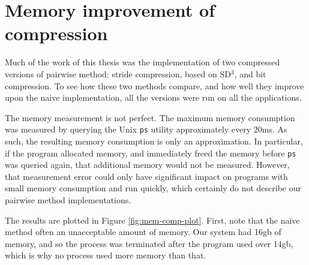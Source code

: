 \documentclass[12pt,twoside]{reedthesis}
\begin{document}
	\section{Memory improvement of compression}
		
		Much of the work of this thesis was the implementation of two compressed versions of pairwise method: stride compression, based on SD$^3$, and bit compression. To see how these two methods compare, and how well they improve upon the naive implementation, all the versions were run on all the applications.
		
		The memory measurement is not perfect. The maximum memory consumption was measured by querying the Unix \texttt{ps} utility approximately every 20ms. As such, the resulting memory consumption is only an approximation. In particular, if the program allocated memory, and immediately freed the memory before \texttt{ps} was queried again, that additional memory would not be measured. However, that measurement error could only have significant impact on programs with small memory consumption and run quickly, which certainly do not describe our pairwise method implementations.
		
		The results are plotted in Figure \ref{fig:mem-comp-plot}. First, note that the naive method often an unacceptable amount of memory. Our system had 16gb of memory, and so the process was terminated after the program used over 14gb, which is why no process used more memory than that. 
		
\end{document}
